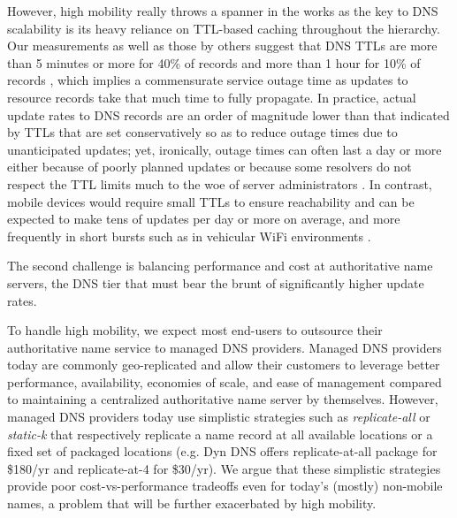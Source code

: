 {{{{However, high mobility really throws a spanner in the works as the key to DNS scalability is its heavy reliance on TTL-based caching throughout the hierarchy. Our measurements as well as those by others suggest that DNS TTLs are more than 5 minutes or more for 40\% of records and more than 1 hour for 10\%  of records \cite{Gao2013}, which implies a commensurate service outage time as updates to resource records take that much time to fully propagate. In practice, actual update rates to DNS records are an order of magnitude lower than that indicated by TTLs that are set conservatively so as to reduce outage times due to unanticipated updates; yet, ironically, outage times can often last a day or more either because of poorly planned updates or because some resolvers do not respect the TTL limits much to the woe of server administrators \cite{serverfault}. In contrast, mobile devices would require small TTLs to ensure reachability and can be expected to make tens of updates per day or more on average, and more frequently in short bursts such as in vehicular WiFi environments \cite{Wiffler}. 

The second challenge is balancing performance and cost at authoritative name servers, the DNS tier that must bear the brunt of significantly higher update rates. 
}



To handle high mobility, we expect most end-users to outsource their authoritative name service to managed DNS providers. Managed DNS providers today are commonly geo-replicated and allow their customers to leverage better performance, availability, economies of scale, and ease of management compared to maintaining a centralized authoritative name server by themselves. However, managed DNS providers today use simplistic strategies such as {\em replicate-all} or {\em static-k} that respectively replicate a name record at all available locations or a fixed set of packaged locations (e.g. Dyn DNS offers replicate-at-all package for \$180/yr and replicate-at-4  for \$30/yr). We argue that these simplistic strategies provide poor cost-vs-performance tradeoffs even for today's (mostly) non-mobile names, a problem that will be further exacerbated by high mobility.

}}}
